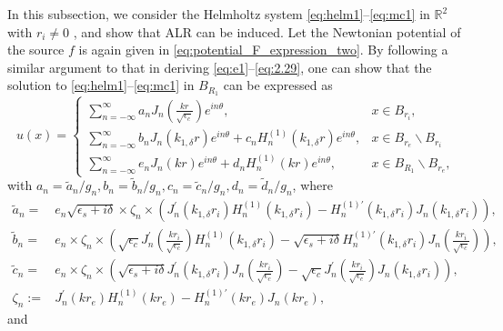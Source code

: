 \documentclass[11pt,reqno,twoside]{amsart}
\theoremstyle{definition}
\theoremstyle{remark}
\numberwithin{equation}{section}
\begin{document}
In this subsection, we consider the Helmholtz system \eqref{eq:helm1}--\eqref{eq:mc1} in $\mathbb{R}^2$ with $r_i\neq 0$ , and show that ALR can be induced. Let the Newtonian potential of the source $f$ is again given in \eqref{eq:potential_F_expression_two}. By following a similar argument to that in deriving \eqref{eq:e1}--\eqref{eq:2.29}, one can show that the solution to \eqref{eq:helm1}--\eqref{eq:mc1} in $B_{R_1}$ can be expressed as
\begin{equation}
  u(x)=\left\{
         \begin{array}{ll}
          { \sum_{n=-\infty}^{\infty} a_n J_n(\frac{kr}{\sqrt{\epsilon_c}}) e^{in\theta}, }& x\in B_{r_i}, \\
         { \sum_{n=-\infty}^{\infty} b_n J_n(k_{1,\delta}r) e^{in\theta} + c_n H_n^{(1)}(k_{1,\delta}r) e^{in\theta} ,} & x\in B_{r_e}\backslash B_{r_i}  \\
          {\sum_{n=-\infty}^{\infty} e_n J_n(kr) e^{in\theta} + d_n H_n^{(1)}(kr) e^{in\theta} ,} & x\in B_{R_1}\backslash B_{r_e},
         \end{array}
       \right.
\end{equation}
with $a_n={\tilde{a}_n}/{g_n }, b_n={\tilde{b}_n}/{g_n }, c_n={\tilde{c}_n}/{g_n }, d_n={\tilde{d}_n}/{g_n }$, where
\begin{align}
\tilde{a}_n= & e_n \sqrt{\epsilon_s+i\delta}\times \zeta_n \times \left(J_n^{\prime}(k_{1,\delta}r_i) H_n^{(1)}(k_{1,\delta}r_i) - H_n^{(1)\prime}(k_{1,\delta}r_i)J_n(k_{1,\delta}r_i)\right),\\
\tilde{b}_n= & e_n \times \zeta_n\times \left(\sqrt{\epsilon_c}J_n^{\prime}(\frac{kr_i}{\sqrt{\epsilon_c}}) H_n^{(1)}(k_{1,\delta}r_i) - \sqrt{\epsilon_s+i\delta} H_n^{(1)\prime}(k_{1,\delta}r_i)J_n(\frac{kr_i}{\sqrt{\epsilon_c}})\right),  \\
  \tilde{c}_n= & e_n \times \zeta_n\times \left(\sqrt{\epsilon_s+i\delta} J_n^{\prime}(k_{1,\delta}r_i)J_n(\frac{kr_i}{\sqrt{\epsilon_c}}) - \sqrt{\epsilon_c}J_n^{\prime}(\frac{kr_i}{\sqrt{\epsilon_c}}) J_n(k_{1,\delta}r_i) \right),\\
   \zeta_n:=& J_n^{\prime}(kr_e) H_n^{(1)}(kr_e) - H_n^{(1)\prime}(kr_e)J_n(kr_e),
\end{align}
and
\end{document}
